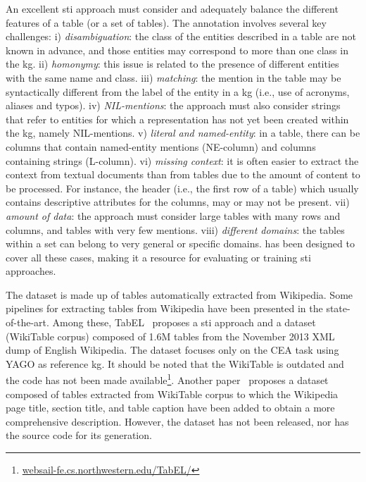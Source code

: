 An excellent \ac{sti} approach must consider and adequately balance the different features of a table (or a set of tables). The annotation involves several key challenges: 
i) \textit{disambiguation}: the class of the entities described in a table are not known in advance, and those entities may correspond to more than one class in the \ac{kg}.
ii) \textit{homonymy}: this issue is related to the presence of different entities with the same name and class.
iii) \textit{matching}: the mention in the table may be syntactically different from the label of the entity in a \ac{kg} (i.e., use of acronyms, aliases and typos).
iv) \textit{NIL-mentions}: the approach must also consider strings that refer to entities for which a representation has not yet been created within the \ac{kg}, namely NIL-mentions. 
v) \textit{literal and named-entity}: in a table, there can be columns that contain named-entity mentions (NE-column) and columns containing strings (L-column).
vi) \textit{missing context}: it is often easier to extract the context from textual documents than from tables due to the amount of content to be processed. For instance, the header (i.e., the first row of a table) which usually contains descriptive attributes for the columns, may or may not be present.
vii) \textit{amount of data}: the approach must consider large tables with many rows and columns, and tables with very few mentions.
viii) \textit{different domains}: the tables within a set can belong to very general or specific domains. \mammotab has been designed to cover all these cases, making it a resource for evaluating or training \ac{sti} approaches.

The dataset is made up of tables automatically extracted from Wikipedia.
Some pipelines for extracting tables from Wikipedia have been presented in the state-of-the-art. Among these, TabEL~\cite{Bhagavatula2015} proposes a \ac{sti} approach and a dataset (WikiTable corpus) composed of 1.6M tables from the November 2013 XML dump of English Wikipedia. The dataset focuses only on the CEA task using YAGO as reference \ac{kg}. It should be noted that the WikiTable is outdated and the code has not been made available\footnote{\href{http://websail-fe.cs.northwestern.edu/TabEL/index.html\#content-code}{websail-fe.cs.northwestern.edu/TabEL/}}. Another paper~\cite{Xiang2022} proposes a dataset composed of  tables extracted from WikiTable corpus to which the Wikipedia page title, section title, and table caption have been added to obtain a more comprehensive description. However, the dataset has not been released, nor has the source code for its generation.

